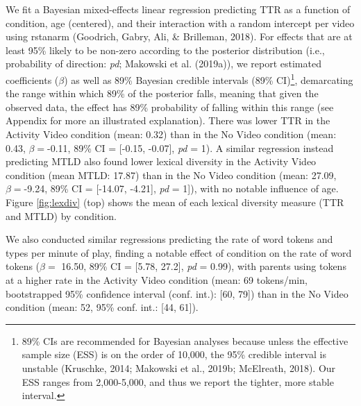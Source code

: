 \documentclass[man,floatsintext]{apa6}
\begin{document}
We fit a Bayesian mixed-effects linear regression predicting TTR as a function of condition, age (centered), and their interaction with a random intercept per video using rstanarm (Goodrich, Gabry, Ali, \& Brilleman, 2018).
For effects that are at least 95\% likely to be non-zero according to the posterior distribution (i.e., probability of direction: \emph{pd}; Makowski et al. (2019a)), we report estimated coefficients (\(\beta\)) as well as 89\% Bayesian credible intervals (89\% CI)\footnote{89\% CIs are recommended for Bayesian analyses because unless the effective sample size (ESS) is on the order of 10,000, the 95\% credible interval is unstable (Kruschke, 2014; Makowski et al., 2019b; McElreath, 2018). Our ESS ranges from 2,000-5,000, and thus we report the tighter, more stable interval.}, demarcating the range within which 89\% of the posterior falls, meaning that given the observed data, the effect has 89\% probability of falling within this range (see Appendix for more an illustrated explanation).
There was lower TTR in the Activity Video condition (mean: 0.32) than in the No Video condition (mean: 0.43, \(\beta=\)-0.11, 89\% CI = {[}-0.15, -0.07{]}, \emph{pd} = 1).
A similar regression instead predicting MTLD also found lower lexical diversity in the Activity Video condition (mean MTLD: 17.87) than in the No Video condition (mean: 27.09, \(\beta=\)-9.24, 89\% CI = {[}-14.07, -4.21{]}, \emph{pd} = 1{]}), with no notable influence of age.
Figure \ref{fig:lexdiv} (top) shows the mean of each lexical diversity measure (TTR and MTLD) by condition.

We also conducted similar regressions predicting the rate of word tokens and types per minute of play, finding a notable effect of condition on the rate of word tokens (\(\beta=\) 16.50, 89\% CI = {[}5.78, 27.2{]}, \emph{pd} = 0.99), with parents using tokens at a higher rate in the Activity Video condition (mean: 69 tokens/min, bootstrapped 95\% confidence interval (conf. int.): {[}60, 79{]}) than in the No Video condition (mean: 52, 95\% conf. int.: {[}44, 61{]}).
\end{document}
